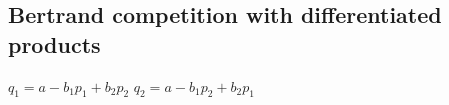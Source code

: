 
\subsection{Bertrand competition with differentiated products}

\(q_1=a-b_1p_1+b_2p_2\)
\(q_2=a-b_1p_2+b_2p_1\)

